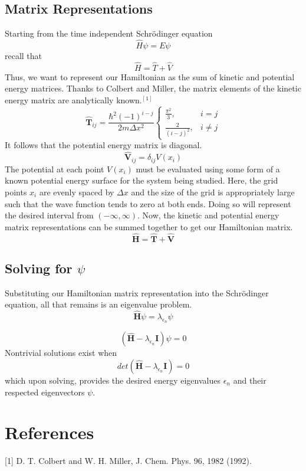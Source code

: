\documentclass[12pt]{article}
\begin{document}
\subsection{Matrix Representations}
Starting from the time independent Schr{\"o}dinger equation
\begin{equation}
\hat{H}\psi = E\psi
\end{equation}
recall that
\begin{equation}
\hat{H}=\hat{T}+\hat{V}
\end{equation}
Thus, we want to represent our Hamiltonian as the sum of kinetic and potential energy matrices.
Thanks to Colbert and Miller, the matrix elements of the kinetic energy matrix are analytically known.$^{[1]}$
\begin{equation}
\hat{\textbf{T}}_{ij} = \frac{\hbar^2(-1)^{i-j}}{2m\Delta{x^2}}
\begin{cases}
\frac{\pi^2}{3}, &i=j\\
\frac{2}{(i-j)^2}, &i\neq{j}
\end{cases}
\end{equation}
It follows that the potential energy matrix is diagonal.
\begin{equation}
\hat{\textbf{V}}_{ij}=\delta_{ij}V(x_i)
\end{equation}
The potential at each point $V(x_i)$ must be evaluated using some form of a known potential energy surface for the system being studied. 
Here, the grid points $x_i$ are evenly spaced by $\Delta{x}$ and the size of the grid is appropriately large such that the wave function tends to zero at both ends.
Doing so will represent the desired interval from $(-\infty, \infty)$.
Now, the kinetic and potential energy matrix representations can be summed together to get our Hamiltonian matrix.
\begin{equation}
\hat{\textbf{H}}=\hat{\textbf{T}}+\hat{\textbf{V}}
\end{equation}

\subsection{Solving for $\psi$}
Substituting our Hamiltonian matrix representation into the Schr{\"o}dinger equation, all that remains is an eigenvalue problem.
\begin{equation}
\hat{\textbf{H}}\psi=\lambda_{{\epsilon}_n}\psi
\end{equation}

\begin{equation}
(\hat{\textbf{H}}-\lambda_{{\epsilon}_n}\textbf{I})\psi=0
\end{equation}
Nontrivial solutions exist when 
\begin{equation}
det(\hat{\textbf{H}}-\lambda_{{\epsilon}_n}\textbf{I})=0
\end{equation}
which upon solving, provides the desired energy eigenvalues $\epsilon_n$ and their respected eigenvectors $\psi$.

\section{References}
[1] D. T. Colbert and W. H. Miller, J. Chem. Phys. 96, 1982 (1992).
\end{document}
